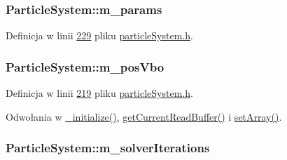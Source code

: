 \hypertarget{class_particle_system_ab765472aed6a1b5f0d2f98a3a906c417}{
\subsubsection[{m\-\_\-params}]{ Particle\-System\-::m\-\_\-params\hspace{0.3cm}{\ttfamily [protected]}}}\label{class_particle_system_ab765472aed6a1b5f0d2f98a3a906c417}


Definicja w linii \hyperlink{particle_system_8h_source_l00229}{229} pliku \hyperlink{particle_system_8h_source}{particle\-System.\-h}.

\hypertarget{class_particle_system_a31f9cccdf5dbae6f72867665bd8761e3}{
\subsubsection[{m\-\_\-pos\-Vbo}]{ Particle\-System\-::m\-\_\-pos\-Vbo\hspace{0.3cm}{\ttfamily [protected]}}}\label{class_particle_system_a31f9cccdf5dbae6f72867665bd8761e3}


Definicja w linii \hyperlink{particle_system_8h_source_l00219}{219} pliku \hyperlink{particle_system_8h_source}{particle\-System.\-h}.



Odwołania w \hyperlink{particle_system_8cpp_source_l00142}{\-\_\-initialize()}, \hyperlink{particle_system_8h_source_l00057}{get\-Current\-Read\-Buffer()} i \hyperlink{particle_system_8cpp_source_l00403}{set\-Array()}.

\hypertarget{class_particle_system_a7b4b053433c052518b8ecce1b02000f5}{
\subsubsection[{m\-\_\-solver\-Iterations}]{ Particle\-System\-::m\-\_\-solver\-Iterations\hspace{0.3cm}{\ttfamily [protected]}}}\label{class_particle_system_a7b4b053433c052518b8ecce1b02000f5}


